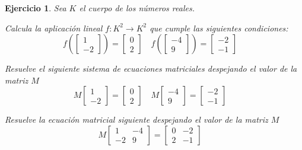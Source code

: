 \documentclass[12pt]{amsart}
\newtheorem{ejer}{Ejercicio}
\begin{document}
\begin{ejer} Sea $K$ el cuerpo de los n\'umeros reales.
\newline
\noindent\begin{minipage}{\textwidth}
\begin{tcolorbox}[colback = green!20!white,title=Versión Aplicación]
Calcula la aplicaci\'on lineal $f:K^{2} \to K^{2}$ que cumple las siguientes condiciones: 
\[f\left(\left[\begin{array}{r}
1 \\
-2
\end{array}\right]\right) = \left[\begin{array}{r}
0 \\
2
\end{array}\right] \quad f\left(\left[\begin{array}{r}
-4 \\
9
\end{array}\right]\right) = \left[\begin{array}{r}
-2 \\
-1
\end{array}\right] \quad 
\]\end{tcolorbox}
\end{minipage} \newline
\noindent\begin{minipage}{\textwidth}
\begin{tcolorbox}[colback = blue!20!white,title=Versión Sistema Matricial]
Resuelve el siguiente sistema de ecuaciones matriciales despejando el valor de la matriz $M$
\[M \left[\begin{array}{r}
1 \\
-2
\end{array}\right] = \left[\begin{array}{r}
0 \\
2
\end{array}\right] \quad M \left[\begin{array}{r}
-4 \\
9
\end{array}\right] = \left[\begin{array}{r}
-2 \\
-1
\end{array}\right] \quad 
\]\end{tcolorbox}
\end{minipage} \newline
\noindent\begin{minipage}{\textwidth} 
\begin{tcolorbox}[colback = red!20!white,title=Versión Ecuación Matricial]
Resuelve la ecuación matricial siguiente despejando el valor de la matriz $M$
\[M \left[\begin{array}{rr}
1 & -4 \\
-2 & 9
\end{array}\right] = \left[\begin{array}{rr}
0 & -2 \\
2 & -1
\end{array}\right] \quad 
\]
\end{tcolorbox}
\end{minipage}%
\end{ejer}
\end{document}
